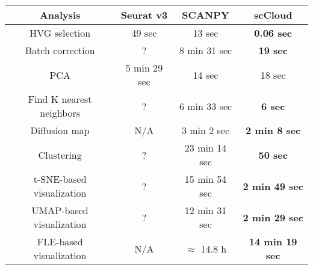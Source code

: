 \documentclass[10pt]{article}
\begin{document}
\begin{table}[H]
	\centering
	\begin{tabular}{|c|c|c|c|}
		\hline
		Analysis & Seurat v3 & SCANPY & scCloud\\
		\hline \hline
		HVG selection & 49 sec & 13 sec & \textbf{0.06 sec} \\
		\hline
		Batch correction & ? & 8 min 31 sec & \textbf{19 sec} \\
		\hline
		PCA & 5 min 29 sec & 14 sec & 18 sec \\
		\hline
		Find K nearest neighbors &  ? &  6 min 33 sec & \textbf{6 sec}\\
		\hline
		Diffusion map & N/A & 3 min 2 sec & \textbf{2 min 8 sec} \\
		\hline 
		Clustering & ? & 23 min 14 sec & \textbf{50 sec}\\
		\hline
		t-SNE-based visualization & ? & 15 min 54 sec & \textbf{2 min 49 sec}\\
		\hline
		UMAP-based visualization & ? & 12 min 31 sec & \textbf{2 min 29 sec}\\
		\hline
		FLE-based visualization & N/A & $\approx$ 14.8  h & \textbf{14 min 19 sec}\\
		\hline
	\end{tabular}
\end{table}
\end{document}
